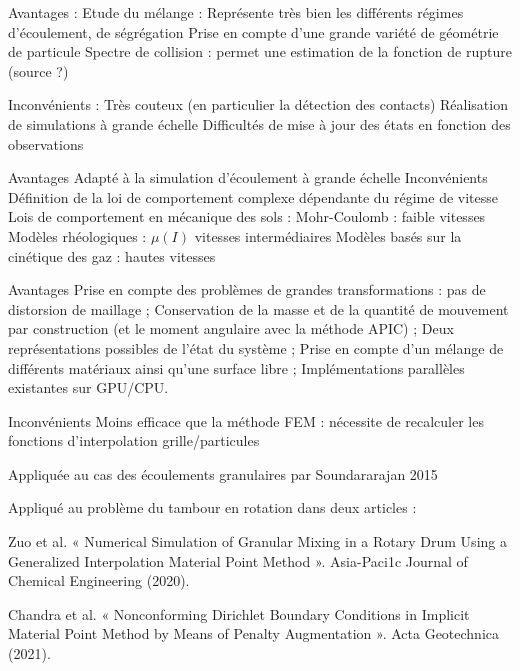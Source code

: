 Avantages :
Etude du mélange : Représente très bien les différents régimes d’écoulement, de ségrégation
Prise en compte d’une grande variété de géométrie de particule
Spectre de collision : permet une estimation de la fonction de rupture (source ?)

Inconvénients :
Très couteux (en particulier la détection des contacts)
Réalisation de simulations à grande échelle
Difficultés de mise à jour des états en fonction des observations

Avantages
Adapté à la simulation d’écoulement à grande échelle
Inconvénients
Définition de la loi de comportement complexe dépendante du régime de vitesse
Lois de comportement en mécanique des sols : Mohr-Coulomb : faible vitesses
Modèles rhéologiques : $\mu(I)$ vitesses intermédiaires
Modèles basés sur la cinétique des gaz : hautes vitesses

Avantages
Prise en compte des problèmes de grandes transformations : pas de distorsion de maillage ;
Conservation de la masse et de la quantité de mouvement par construction (et le moment angulaire avec la méthode APIC) ;
Deux représentations possibles de l’état du système ;
Prise en compte d’un mélange de différents matériaux ainsi qu’une surface libre ;
Implémentations parallèles existantes sur GPU/CPU.

Inconvénients
Moins efficace que la méthode FEM : nécessite de recalculer les fonctions d’interpolation grille/particules

Appliquée au cas des écoulements granulaires par Soundararajan 2015

Appliqué au problème du tambour en rotation dans deux articles :

Zuo et al. « Numerical Simulation of Granular Mixing in a Rotary Drum Using a Generalized Interpolation Material Point Method ». Asia-Paci1c Journal of Chemical
Engineering (2020).

Chandra et al. « Nonconforming Dirichlet Boundary Conditions in Implicit Material Point Method by Means of Penalty Augmentation ». Acta Geotechnica (2021).


